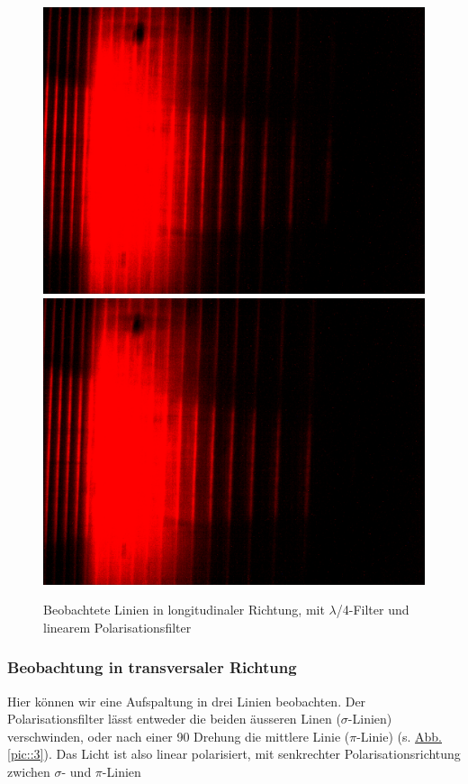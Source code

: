       \begin{figure}[H]
        \centering
        \includegraphics[width=.6\paperwidth, trim={0 650pt 0 200pt}, clip]{Auswertung/data/long/10A_2}
        \includegraphics[width=.6\paperwidth, trim={0 0 0 886pt}, clip]{Auswertung/data/long/10A_1}
        \caption{Beobachtete Linien in longitudinaler Richtung, mit $\lambda$/4-Filter und linearem Polarisationsfilter}
        \label{pic::2}
      \end{figure}

    \subsubsection{Beobachtung in transversaler Richtung}
      Hier können wir eine Aufspaltung in drei Linien beobachten. Der Polarisationsfilter lässt entweder die beiden äusseren Linen ($\sigma$-Linien) verschwinden, oder nach einer \SI{90}{\deg} Drehung die mittlere Linie ($\pi$-Linie) (s. \hyperref[pic::3]{Abb. \ref*{pic::3}}). Das Licht ist also linear polarisiert, mit senkrechter Polarisationsrichtung zwichen $\sigma$- und $\pi$-Linien


